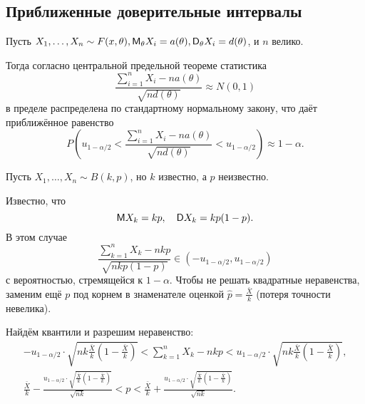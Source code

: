 \subsection{Приближенные доверительные интервалы}
  Пусть $X_1, \dots, X_n \sim F(x, \theta), \mathsf M_\theta X_i = a(\theta), \mathsf D_\theta
	X_i = d(\theta)$, и $n$ велико. 

	Тогда согласно центральной предельной теореме статистика
\[
	\frac{\sum_{i=1}^n X_i - n a(\theta)}{\sqrt{n d(\theta)}} \approx N(0, 1)
\]
в пределе распределена по стандартному нормальному закону, что даёт приближённое
равенство
\[
	P\left(u_{1 - \alpha/2} < \frac{\sum_{i=1}^n X_i - n a(\theta)}{\sqrt{n d(\theta)}}<
	u_{1-\alpha/2}\right) \approx 1 - \alpha.
\]

\begin{ex}
  Пусть $X_1, \dots, X_n \sim B(k, p)$, но $k$ известно, а $ p $ неизвестно.

	Известно, что 
	\[
		\mathsf M X_k = kp, \quad \mathsf D X_k = k p (1-p).
	\]
В этом случае
\[
	\frac{\sum_{k=1}^n X_k - n k p}{\sqrt{nkp(1-p)}} \in (-u_{1-\alpha/2}, u_{1-\alpha/2})
\]
с вероятностью, стремящейся к $ 1 - \alpha $. Чтобы не решать квадратные
неравенства, заменим ещё $ p $ под корнем в
знаменателе оценкой $\hat p = \frac{\bar X}{k}$ (потеря точности невелика). 

Найдём квантили и разрешим неравенство:
\begin{gather*}
	-u_{1-\alpha/2}\cdot \sqrt{nk \frac{\bar X}{k} \left(1 - \frac{\bar X}{k}\right)} <
	\sum_{k=1}^n X_k -
	nkp < u_{1-\alpha/2} \cdot \sqrt{nk \frac{\bar X}{k} \left(1 - \frac{\bar X}{k}\right)}, \\
	\frac{\bar X}{k} - \frac{u_{1-\alpha/2}\cdot \sqrt{\frac{\bar X}{k} \left(1 - \frac{\bar
	X}{k}\right)}}{\sqrt{nk}} < p < \frac{\bar X}{k} + \frac{u_{1-\alpha/2}
\cdot \sqrt{\frac{\bar X}{k} \left(1 - \frac{\bar X}{k}\right)}}{\sqrt{nk}}.
\end{gather*}
\end{ex}
